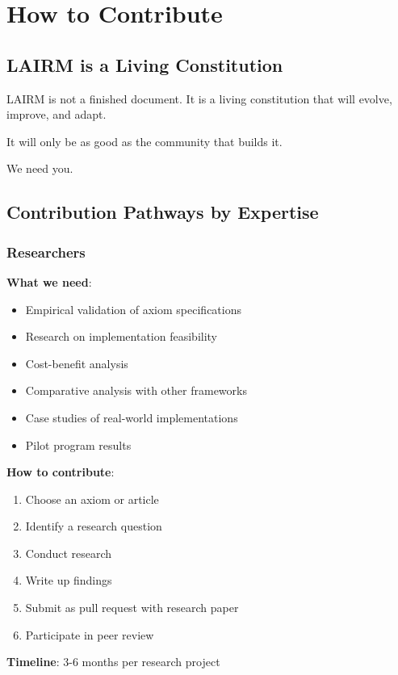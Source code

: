 \documentclass[12pt,a4paper,twoside,openright]{book}
\begin{document}
\chapter{How to Contribute}
\label{ch:contribute}

\section{LAIRM is a Living Constitution}

LAIRM is not a finished document. It is a living constitution that will evolve, improve, and adapt.

It will only be as good as the community that builds it.

We need you.

\section{Contribution Pathways by Expertise}

\subsection{Researchers}

\textbf{What we need}:
\begin{itemize}
    \item Empirical validation of axiom specifications
    \item Research on implementation feasibility
    \item Cost-benefit analysis
    \item Comparative analysis with other frameworks
    \item Case studies of real-world implementations
    \item Pilot program results
\end{itemize}

\textbf{How to contribute}:
\begin{enumerate}
    \item Choose an axiom or article
    \item Identify a research question
    \item Conduct research
    \item Write up findings
    \item Submit as pull request with research paper
    \item Participate in peer review
\end{enumerate}

\textbf{Timeline}: 3-6 months per research project
\end{document}
